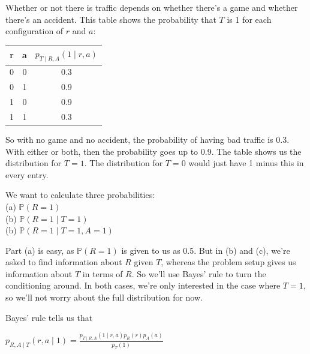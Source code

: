 \documentclass[6008notes.tex]{subfiles}
\begin{document}
Whether or not there is traffic depends on whether there's a game and whether there's an accident. This table shows the probability that $T$ is 1 for each configuration of $r$ and $a$:

\begin{center}
\begin{tabular}{ c  c | c }
\textbf{r} & \textbf{a} & $p_{T \mid R,A} (1 \mid r,a)$ \\
\hline
0 &	0 &	0.3 \\
0 &	1 &	0.9 \\
1 &	0 &	0.9 \\
1 &	1 &	0.3 \\
\end{tabular}
\end{center}

So with no game and no accident, the probability of having bad traffic is 0.3. With either or both, then the probability goes up to 0.9. The table shows us the distribution for $T = 1$. The distribution for $T = 0$ would just have 1 minus this in every entry. 

We want to calculate three probabilities:\\
(a) $\mathbb{P}(R = 1)$ \\
(b) $\mathbb{P}(R = 1 \mid T = 1)$ \\
(b) $\mathbb{P}(R = 1 \mid T = 1, A = 1)$ 

Part (a) is easy, as $\mathbb{P}(R = 1)$ is given to us as 0.5. But in (b) and (c), we're asked to find information about $R$ given $T$, whereas the problem setup gives us information about $T$ in terms of $R$. So we'll use Bayes' rule to turn the conditioning around. In both cases, we're only interested in the case where $T = 1$, so we'll not worry about the full distribution for now.

Bayes' rule tells us that 

{\centering$p_{R,A \mid T}(r,a \mid 1) = \frac{p_{T \mid R,A}(1 \mid r,a) p_R(r) p_A(a)}{p_T(1)}$ \par}

\end{document}

